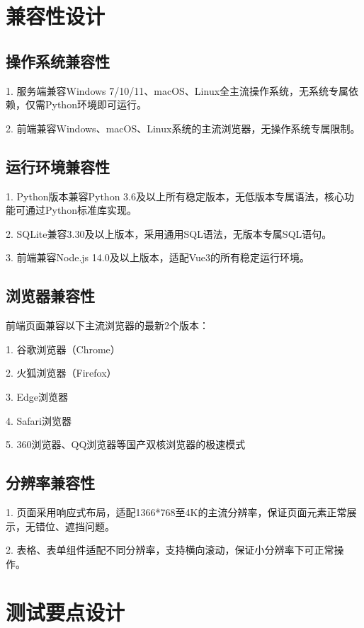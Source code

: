 \documentclass[12pt, a4paper]{article}
\begin{document}
\newpage
\section{兼容性设计}

\subsection{操作系统兼容性}

1. 服务端兼容Windows 7/10/11、macOS、Linux全主流操作系统，无系统专属依赖，仅需Python环境即可运行。

2. 前端兼容Windows、macOS、Linux系统的主流浏览器，无操作系统专属限制。

\subsection{运行环境兼容性}

1. Python版本兼容Python 3.6及以上所有稳定版本，无低版本专属语法，核心功能可通过Python标准库实现。

2. SQLite兼容3.30及以上版本，采用通用SQL语法，无版本专属SQL语句。

3. 前端兼容Node.js 14.0及以上版本，适配Vue3的所有稳定运行环境。

\subsection{浏览器兼容性}

前端页面兼容以下主流浏览器的最新2个版本：

1. 谷歌浏览器（Chrome）

2. 火狐浏览器（Firefox）

3. Edge浏览器

4. Safari浏览器

5. 360浏览器、QQ浏览器等国产双核浏览器的极速模式

\subsection{分辨率兼容性}

1. 页面采用响应式布局，适配1366*768至4K的主流分辨率，保证页面元素正常展示，无错位、遮挡问题。

2. 表格、表单组件适配不同分辨率，支持横向滚动，保证小分辨率下可正常操作。

\section{测试要点设计}
\end{document}

